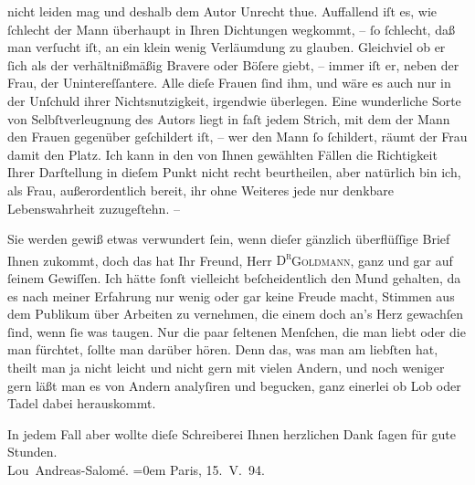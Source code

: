                nicht leiden mag und deshalb dem Autor Unrecht thue. Auffallend iſt es, wie ſchlecht
               der Mann überhaupt in Ihren Dichtungen wegkommt, – ſo ſchlecht, daß man verſucht iſt,
               an ein klein wenig Verläumdung zu glauben. Gleichviel ob er ſich als der
               verhältnißmäßig Bravere oder Böſere giebt, – immer iſt er, neben der Frau, der
               Unintereſſantere. Alle dieſe Frauen ſind ihm, und wäre es auch nur in der Unſchuld
               ihrer Nichtsnutzigkeit, irgendwie überlegen. Eine wunderliche Sorte von
               Selbſtverleugnung \introOben{}des Autors\introOben{} liegt in faſt jedem Strich, mit
               dem der Mann den Frauen gegenüber geſchildert iſt, {\pb}– wer den Mann ſo ſchildert, räumt der
               Frau damit den Platz. Ich kann in den von Ihnen gewählten Fällen die Richtigkeit
               Ihrer Darſtellung in dieſem Punkt nicht recht beurtheilen, aber natürlich bin ich,
               als Frau, außerordentlich bereit, ihr ohne Weiteres jede nur denkbare Lebenswahrheit
               zuzugeſtehn. –\pend
           
\pstart
           Sie werden gewiß etwas verwundert ſein, wenn dieſer gänzlich überflüſſige Brief Ihnen
               zukommt, doch das hat Ihr Freund, Herr \textsc{D\textsuperscript{r}}\textsc{Goldmann}, ganz und gar auf ſeinem Gewiſſen. Ich hätte ſonſt vielleicht beſcheidentlich
               den Mund gehalten, da es nach meiner Erfahrung nur wenig oder gar keine Freude macht,
               Stimmen aus dem Publikum über Arbeiten zu vernehmen, die einem doch an's Herz
               gewachſen ſind, wenn ſie was taugen. Nur die paar ſeltenen Menſchen, die man liebt
               oder die man fürchtet, ſollte man darüber hören. Denn das, was man am liebſten hat,
               theilt man ja {\pb}nicht leicht und nicht gern
               mit vielen Andern, und noch weniger gern läßt man es von Andern analyſiren und
               begucken, ganz einerlei ob Lob oder Tadel dabei herauskommt.\pend
           
\pstart
           In jedem Fall aber wollte dieſe Schreiberei Ihnen herzlichen Dank ſagen für gute Stunden.{\\[\baselineskip]}\spacefill\mbox{Lou Andreas-Salomé.}\pend
           \leftskip=0em{}
\pstart
           Paris, 15. V. 94. \pend
           \endnumbering{}  
      